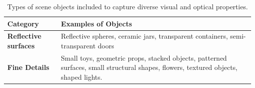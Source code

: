 \begin{table}[t]
\centering
\caption{Types of scene objects included to capture diverse visual and optical properties.}
\label{tab:scene_objects}
\small 
\begin{tabularx}{\linewidth}{>{\raggedright\arraybackslash}p{3cm} X} 
\toprule
\textbf{Category} & \textbf{Examples of Objects} \\
\midrule
\textbf{Reflective surfaces} & Reflective spheres, ceramic jars, transparent containers, semi-transparent doors \\ %
\addlinespace[0.6em]
\textbf{Fine Details} & Small toys, geometric props, stacked objects, patterned surfaces, small structural shapes, flowers, textured objects, shaped lights. \\ %
\bottomrule
\end{tabularx}
\end{table}


